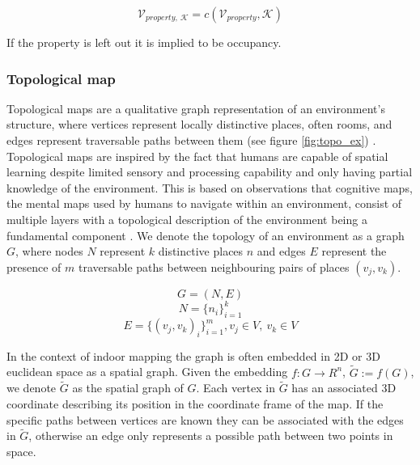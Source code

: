 \begin{equation}
    \label{eq:c}
    \mathcal{V}_{property,\  \mathcal{K}} = c(\mathcal{V}_{property},\mathcal{K})
\end{equation}

If the property is left out it is implied to be occupancy.


\subsubsection{Topological map}
Topological maps are a qualitative graph representation of an environment's structure, where vertices represent locally distinctive places, often rooms, and edges represent traversable paths between them  (see figure \ref{fig:topo_ex}) \citep{thrun_learning_1998,kuipers_robust_1988}. Topological maps are inspired by the fact that humans are capable of spatial learning despite limited sensory and processing capability and only having partial knowledge of the environment. This is based on observations that cognitive maps, the mental maps used by humans to navigate within an environment, consist of multiple layers with a topological description of the environment being a fundamental component \citep{kuipers_robust_1988,kuipers_modeling_1978}. We denote the topology of an environment as a graph \(G\), where nodes \(N\) represent \(k\) distinctive places \(n\) and edges \(E\) represent the presence of \(m\) traversable paths between neighbouring pairs of places \((v_j,v_k)\).

\begin{equation}
    \label{eq:G}
    G=(N, E)
\end{equation}
\begin{equation}
    \label{eq:V}
    N=\{n_i\}_{i=1}^k
\end{equation}
\begin{equation}
    \label{eq:E}
    E=\{(v_j,v_k)_i\}_{i=1}^m, v_j \in V,\ v_k \in V
\end{equation}

In the context of indoor mapping the graph is often embedded in 2D or 3D euclidean space as a spatial graph. Given the embedding \(f : G \rightarrow R^n\), \( \widetilde{G}:=f(G)\), we denote \(\widetilde{G}\) as the spatial graph of \(G\). Each vertex in \(\widetilde{G}\) has an associated 3D coordinate describing its position in the coordinate frame of the map. If the specific paths between vertices are known they can be associated with the edges in \(\widetilde{G}\), otherwise an edge only represents a possible path between two points in space.

